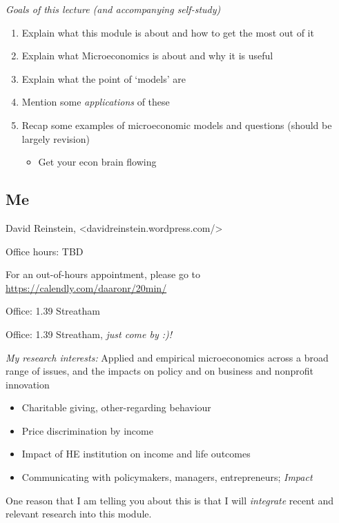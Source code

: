 \documentclass[]{article}
\providecommand{\tightlist}{%
  \setlength{\itemsep}{0pt}\setlength{\parskip}{0pt}}
\begin{document}
\emph{Goals of this lecture (and accompanying self-study)}

\begin{enumerate}
\def\labelenumi{\arabic{enumi}.}
\tightlist
\item
  Explain what this module is about and how to get the most out of it
\item
  Explain what Microeconomics is about and why it is useful
\item
  Explain what the point of `models' are
\item
  Mention some \emph{applications} of these
\item
  Recap some examples of microeconomic models and questions (should be largely revision)

  \begin{itemize}
  \tightlist
  \item
    Get your econ brain flowing
  \end{itemize}
\end{enumerate}

\hypertarget{me}{%
\subsection{Me}\label{me}}

David Reinstein, \textless{}davidreinstein.wordpress.com/\textgreater{}

Office hours: TBD

For an out-of-hours appointment, please go to \url{https://calendly.com/daaronr/20min/}

Office: 1.39 Streatham

Office: 1.39 Streatham, \emph{just come by :)!}

\bigskip

\emph{My research interests:} Applied and empirical microeconomics across a broad range of issues, and the impacts on policy and on business and nonprofit innovation

\begin{itemize}
\tightlist
\item
  Charitable giving, other-regarding behaviour
\item
  Price discrimination by income
\item
  Impact of HE institution on income and life outcomes
\item
  Communicating with policymakers, managers, entrepreneurs; \emph{Impact}
\end{itemize}

One reason that I am telling you about this is that I will \emph{integrate} recent and relevant research into this module.
\end{document}

